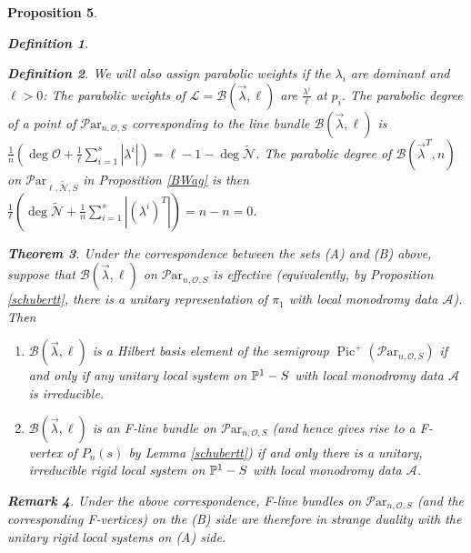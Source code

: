 \documentclass[11pt]{amsart}
\newcommand\Pic{\operatorname{Pic}}
\newcommand\ml{\mathcal{L}}
\newcommand\mn{\mathcal{N}}
\newcommand\Par{\mathcal{P}\text{ar} }
\newtheorem{theorem}{Theorem}[section]
\newtheorem{remark}[theorem]{ Remark}
\newtheorem{proposition}[theorem]{Proposition}
\newtheorem{defi}[theorem]{Definition}
\numberwithin{theorem}{subsection}
\begin{document}
{\begin{proposition}
\begin{defi}
\end{defi}
\begin{defi}\label{amirK}
We will also assign parabolic weights if the $\lambda_i$ are dominant and $\ell>0$: The parabolic weights of $\ml=\mathcal{B}(\vec{\lambda},{\ell})$ are $\frac{{\lambda^i}}{\ell}$ at $p_i$. The parabolic degree of a point of $\Par_{n,\mathcal{O},S}$ corresponding to the line bundle  $\mathcal{B}(\vec{\lambda},{\ell})$ is $\frac{1}{n}(\deg{\mathcal{O}}+\frac{1}{\ell}\sum_{i=1}^s|\lambda^i|)=\ell-1-\deg\widetilde{\mn}$. The parabolic degree of $\mathcal{B}(\vec{\lambda}^T,n)$ on $\Par_{\ell,\widetilde{\mathcal{N}},S}$ in Proposition \ref{BWag} is then $\frac{1}{\ell}(\deg{\widetilde{\mn}}+\frac{1}{n}\sum_{i=1}^s|(\lambda^i)^T|) =n-n=0$.
\end{defi}

\begin{theorem}\label{christmas} 
Under the correspondence between the sets (A) and (B) above, suppose that $\mathcal{B}(\vec{\lambda},\ell)$ on $\Par_{n,{\mathcal{O}},S}$ is effective (equivalently, by Proposition \ref{schubertt}, there is a unitary representation of $\pi_1$ with  local monodromy data $\mathcal{A}$). Then
\begin{enumerate}
\item[(i)] $\mathcal{B}(\vec{\lambda},\ell)$ is a Hilbert basis element of  the semigroup $\Pic^+(\Par_{n,\mathcal{O},S})$ if and only if 
any unitary local system on $\Bbb{P}^1-S$ with local monodromy data $\mathcal{A}$ is  irreducible.
\item[(ii)] $\mathcal{B}(\vec{\lambda},\ell)$ is an F-line bundle on   $\Par_{n,\mathcal{O},S}$ (and hence gives rise to a F-vertex of $P_n(s)$ by Lemma \ref{schubertt}) if and only  there is a unitary, irreducible rigid local system on  $\Bbb{P}^1-S$ with local monodromy data $\mathcal{A}$. 
\end{enumerate}
\end{theorem}
\begin{remark}\label{added}
Under the above correspondence,
F-line bundles on $\Par_{n,\mathcal{O},S}$ (and the corresponding F-vertices) on the (B) side are therefore in strange duality with the unitary rigid local systems on (A) side.
\end{remark}

\end{proposition}}
\end{document}
